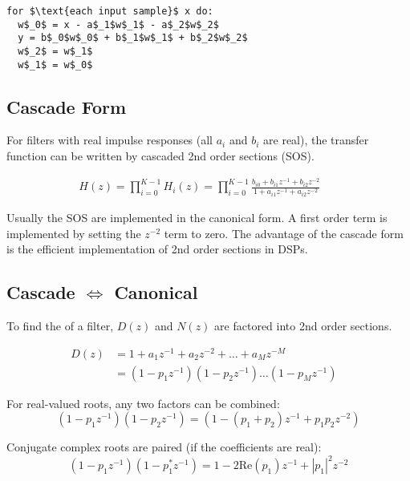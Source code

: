 \begin{center}
	
\end{center}

\begin{lstlisting}[mathescape]
for $\text{each input sample}$ x do:
  w$_0$ = x - a$_1$w$_1$ - a$_2$w$_2$
  y = b$_0$w$_0$ + b$_1$w$_1$ + b$_2$w$_2$
  w$_2$ = w$_1$
  w$_1$ = w$_0$
\end{lstlisting}


\subsection{Cascade Form}
\label{sec:cascadeform}
For filters with real impulse responses (all $a_i$ and $b_i$ are real), the
transfer function can be written by cascaded 2nd order sections (SOS).

\begin{align*}
	H(z) = \prod_{i=0}^{K-1}H_i(z) = \prod_{i=0}^{K-1}\frac
	{b_{i0}+b_{i1}z^{-1}+b_{i2}z^{-2}}
	{1+a_{i1}z^{-1}+a_{i2}z^{-2}} &&
\end{align*}

Usually the SOS are implemented in the canonical form. A first order term is
implemented by setting the $z^{-2}$ term to zero. The advantage of the cascade
form is the efficient implementation of 2nd order sections in DSPs.

\subsection{Cascade $\Leftrightarrow$ Canonical}
To find the  of a filter, $D(z)$ and $N(z)$ are
factored into 2nd order sections.

\begin{align*}
D(z) &= 1 + a_1 z^{-1} + a_2 z^{-2} + \dots + a_M z^{-M} &\\
&=(1-p_1z^{-1})(1-p_2z^{-1}) \dots (1-p_Mz^{-1})&
\end{align*}

For real-valued roots, any two factors can be combined:
\begin{equation*}
	(1 - p_1 z^{-1}) (1 - p_2 z^{-1}) = (1 - (p_1 + p_2) z^{-1} + p_1 p_2 z^{-2})
\end{equation*}

Conjugate complex roots are paired (if the coefficients are real):
\begin{equation*}
	(1 - p_1 z^{-1}) (1 - p_1^* z^{-1}) = 1 - 2 \text{Re}(p_1) z^{-1} + |p_1|^2 z^{-2}
\end{equation*}
